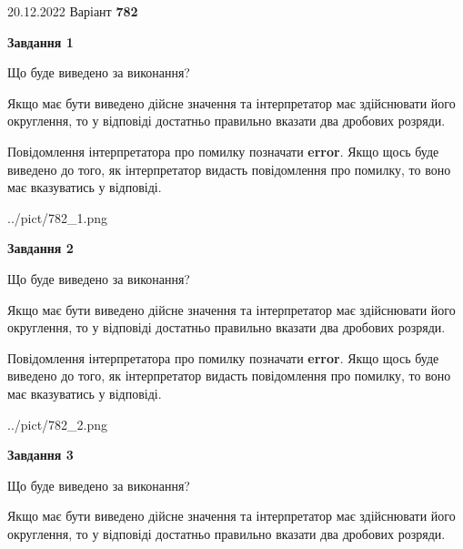 \documentclass[12pt, ukrainian]{article}
\begin{document}
{20.12.2022 Варіант \No \textbf { 782 }\par}
{
\begin {Large}

{\begin {center}\textbf{Завдання 1}\end {center}}\par
Що буде виведено за виконання? \par

Якщо має бути виведено дійсне значення та інтерпретатор має здійснювати його округлення, 
то у відповіді достатньо правильно вказати два дробових розряди.

Повідомлення інтерпретатора про помилку позначати \textbf{error}.
Якщо щось буде виведено до того, як інтерпретатор видасть повідомлення про помилку, 
то воно має вказуватись у відповіді. \par

\begin{center}
	{../pict/782_1.png}
\end{center}
\newpage

{\begin {center}\textbf{Завдання 2}\end {center}}\par
Що буде виведено за виконання? \par

Якщо має бути виведено дійсне значення та інтерпретатор має здійснювати його округлення, 
то у відповіді достатньо правильно вказати два дробових розряди.

Повідомлення інтерпретатора про помилку позначати \textbf{error}.
Якщо щось буде виведено до того, як інтерпретатор видасть повідомлення про помилку, 
то воно має вказуватись у відповіді. \par

\begin{center}
	{../pict/782_2.png}
\end{center}
\newpage

{\begin {center}\textbf{Завдання 3}\end {center}}\par
Що буде виведено за виконання? \par

Якщо має бути виведено дійсне значення та інтерпретатор має здійснювати його округлення, 
то у відповіді достатньо правильно вказати два дробових розряди.


\end{Large}}
\end{document}
